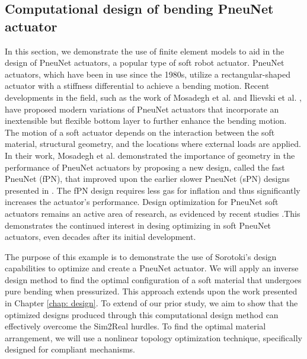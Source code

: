 \subsection{Computational design of bending PneuNet actuator}
In this section, we demonstrate the use of finite element models to aid in the design of PneuNet actuators, a popular type of soft robot actuator. PneuNet actuators, which have been in use since the 1980s, utilize a rectangular-shaped actuator with a stiffness differential to achieve a bending motion. Recent developments in the field, such as the work of Mosadegh et al. \cite{Mosadegh2014} and Ilievski et al. \cite{Ilievski2011Feb}, have proposed modern variations of PneuNet actuators that incorporate an inextensible but flexible bottom layer to further enhance the bending motion. The motion of a soft actuator depends on the interaction between the soft material, structural geometry, and the locations where external loads are applied. In their work, Mosadegh et al. \cite{Mosadegh2014} demonstrated the importance of geometry in the performance of PneuNet actuators by proposing a new design, called the fast PneuNet (fPN), that improved upon the earlier slower PneuNet (sPN) designs presented in \cite{Ilievski2011Feb}. The fPN design requires less gas for inflation and thus significantly increases the actuator's performance. Design optimization for PneuNet soft actuators remains an active area of research, as evidenced by recent studies \cite{Smith2022,Raeisinezhad2021May}.This demonstrates the continued interest in desing optimizing in soft PneuNet actuators, even decades after its initial development.

The purpose of this example is to demonstrate the use of Sorotoki's design capabilities to optimize and create a PneuNet actuator. We will apply an inverse design method to find the optimal configuration of a soft material that undergoes pure bending when pressurized. This approach extends upon the work presented in Chapter \ref{chap: design}. To extend of our prior study, we aim to show that the optimized designs produced through this computational design method can effectively overcome the Sim2Real hurdles. To find the optimal material arrangement, we will use a nonlinear topology optimization technique, specifically designed for compliant mechanisms.

